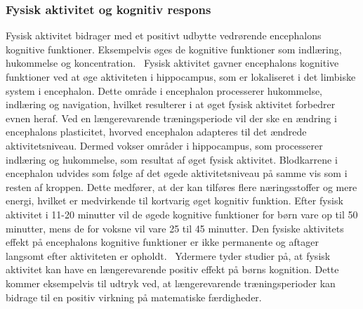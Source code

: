 \subsubsection{Fysisk aktivitet og kognitiv respons}
Fysisk aktivitet bidrager med et positivt udbytte vedrørende encephalons kognitive funktioner. Eksempelvis øges de kognitive funktioner som indlæring, hukommelse og koncentration.~\citep{Berchtold2010,Bugge2015,Schmidt2015} 
Fysisk aktivitet gavner encephalons kognitive funktioner ved at øge aktiviteten i hippocampus, som er lokaliseret i det limbiske system i encephalon. Dette område i encephalon processerer hukommelse, indlæring og navigation, hvilket resulterer i at øget fysisk aktivitet forbedrer evnen heraf. Ved en længerevarende træningsperiode vil der ske en ændring i encephalons plasticitet, hvorved encephalon adapteres til det ændrede aktivitetsniveau. Dermed vokser områder i hippocampus, som processerer indlæring og hukommelse, som resultat af øget fysisk aktivitet. Blodkarrene i encephalon udvides som følge af det øgede aktivitetsniveau på samme vis som i resten af kroppen. Dette medfører, at der kan tilføres flere næringsstoffer og mere energi, hvilket er medvirkende til kortvarig øget kognitiv funktion. 
Efter fysisk aktivitet i 11-20 minutter vil de øgede kognitive funktioner for børn vare op til 50 minutter, mens de for voksne vil vare 25 til 45 minutter. Den fysiske aktivitets effekt på encephalons kognitive funktioner er ikke permanente og aftager langsomt efter aktiviteten er opholdt.~\citep{Cotman2007,Schmidt2015} Ydermere tyder studier på, at fysisk aktivitet kan have en længerevarende positiv effekt på børns kognition. Dette kommer eksempelvis til udtryk ved, at længerevarende træningsperioder kan bidrage til en positiv virkning på matematiske færdigheder.~\citep{SibleyEtnier2003,Bugge2015}
